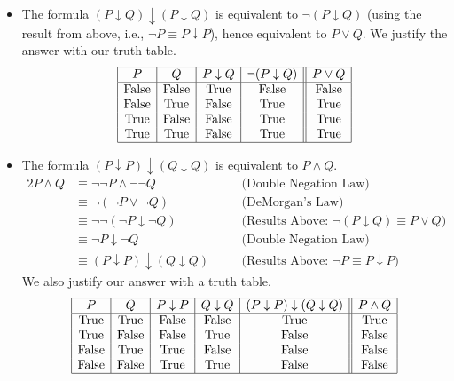 \begin{enumerate}[label=(\alph*)]
\begin{itemize}
    \item The formula $(P \downarrow Q) \downarrow (P \downarrow Q)$ is equivalent to $\neg (P \downarrow Q)$ (using the result from above, i.e., $\neg P \equiv P \downarrow P$), hence equivalent to $P \vee Q$. We justify the answer with our truth table.
    \[
    \begin{array}{|c|c|c|c||c|}
    \hline
    P & Q & P \downarrow Q & \neg (P \downarrow Q) & P \vee Q \\
    \hline
    \text{False} & \text{False} & \text{True} & \text{False} & \text{False}\\
    \text{False} & \text{True} & \text{False} & \text{True} & \text{True} \\
    \text{True} & \text{False} & \text{False} & \text{True} & \text{True} \\
    \text{True} & \text{True} & \text{False} & \text{True} & \text{True} \\
    \hline
    \end{array}
    \]

    \item The formula $(P \downarrow P) \downarrow (Q \downarrow Q)$ is equivalent to $P \wedge Q$.
    \begin{alignat*}{2}
        P \wedge Q & \equiv \neg \neg P \wedge \neg \neg Q && \quad \text{(Double Negation Law)} \\
                   & \equiv \neg (\neg P \vee \neg Q) && \quad \text{(DeMorgan's Law)} \\
                   & \equiv \neg \neg (\neg P \downarrow \neg Q) && \quad \text{(Results Above: $\neg(P \downarrow Q) \equiv P \vee Q$)} \\
                   & \equiv \neg P \downarrow \neg Q && \quad \text{(Double Negation Law)} \\
                   & \equiv (P \downarrow P) \downarrow (Q \downarrow Q) && \quad \text{(Results Above: $\neg P \equiv P \downarrow P$)}
    \end{alignat*}
    We also justify our answer with a truth table.
    \[
    \begin{array}{|c|c|c|c|c||c|}
    \hline
    P & Q & P \downarrow P & Q \downarrow Q & (P \downarrow P) \downarrow (Q \downarrow Q) & P \wedge Q \\
    \hline
    \text{True} & \text{True} & \text{False} & \text{False} & \text{True} & \text{True} \\
    \text{True} & \text{False} & \text{False} & \text{True} & \text{False} & \text{False} \\
    \text{False} & \text{True} & \text{True} & \text{False} & \text{False} & \text{False} \\      
    \text{False} & \text{False} & \text{True} & \text{True} & \text{False} & \text{False} \\
    \hline
    \end{array}
    \]
\end{itemize}
\end{enumerate}

\pagebreak